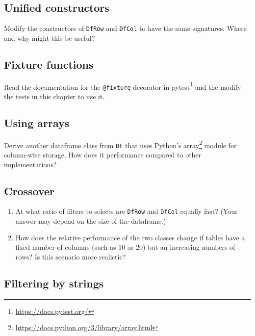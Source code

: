 \documentclass{scrbook}
\newcommand{\hreffoot}[2]{{#1}\footnote{\href{#2}{#2}}}
\begin{document}
\subsection*{Unified constructors}


Modify the constructors of \texttt{DfRow} and \texttt{DfCol} to have the same signatures.
Where and why might this be useful?

\subsection*{Fixture functions}


Read the documentation for the \texttt{@fixture} decorator in \hreffoot{pytest}{https://docs.pytest.org/}
and the modify the tests in this chapter to use it.

\subsection*{Using arrays}


Derive another dataframe class from \texttt{DF}
that uses Python's \hreffoot{array}{https://docs.python.org/3/library/array.html} module for column-wise storage.
How does it performance compared to other implementations?

\subsection*{Crossover}

\begin{enumerate}

\item 

At what ratio of filters to selects are \texttt{DfRow} and \texttt{DfCol} equally fast?
    (Your answer may depend on the size of the dataframe.)



\item 

How does the relative performance of the two classes change
    if tables have a fixed number of columns (such as 10 or 20)
    but an increasing numbers of rows?
    Is this scenario more realistic?



\end{enumerate}

\subsection*{Filtering by strings}
\end{document}
